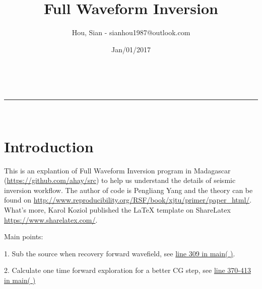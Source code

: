 \documentclass[a4paper,11pt]{article}
\makeatletter
\newcommand{\linia}{\rule{\linewidth}{0.5pt}}
\theoremstyle{mytheor}
\renewcommand{\maketitle}{
\begin{center}
\vspace{2ex}
{\huge \textsc{\@title}}
\vspace{1ex}
\\
\linia\\
\@author \hfill \@date
\vspace{4ex}
\end{center}
}
\makeatother
\begin{document}
\title{Full Waveform Inversion}

\author{Hou, Sian - sianhou1987@outlook.com}

\date{Jan/01/2017}

\maketitle

\section*{Introduction}
This is an explantion of Full Waveform Inversion program in Madagascar (\url{https://github.com/ahay/src}) to help us understand the details of seismic inversion workflow. The author of code is Pengliang Yang and the theory can be found on \url{ http://www.reproducibility.org/RSF/book/xjtu/primer/paper_html/}. What's more, Karol Koziol published the {\LaTeX} template on ShareLatex \url{https://www.sharelatex.com/}.

Main points: 

1. Sub the source when recovery forward wavefield, see \hyperref[mainpoint_1]{line 309 in main( )}.

2. Calculate one time forward exploration for a better CG step, see \hyperref[mainpoint_2]{line 370-413 in main( )}
\end{document}

